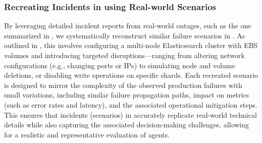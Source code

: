 \subsubsection{Recreating Incidents in \bench using Real-world Scenarios}
By leveraging detailed incident reports from real-world outages, such as the one summarized in , we systematically reconstruct similar failure scenarios in \bench. 
As outlined in , this involves configuring a multi-node Elasticsearch cluster with EBS volumes and introducing targeted disruptions—ranging from altering network configurations (e.g., changing ports or IPs) to simulating node and volume deletions, or disabling write operations on specific shards. 
Each recreated scenario is designed to mirror the complexity of the observed production failures with small variations, including similar failure propagation paths, impact on metrics (such as error rates and latency), and the associated operational mitigation steps. 
This ensures that \bench incidents (scenarios) in \bench accurately replicate real-world technical details while also capturing the associated decision-making challenges, allowing for a realistic and representative evaluation of agents.





